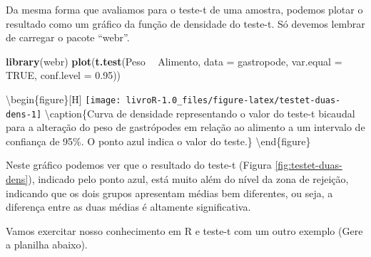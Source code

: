 \documentclass[14pt,titlepage, oneside, openany, a4paper]{book}
\newenvironment{Shaded}{\begin{snugshade}}{\end{snugshade}}
\newcommand{\DataTypeTok}[1]{\textcolor[rgb]{0.13,0.29,0.53}{#1}}
\newcommand{\FloatTok}[1]{\textcolor[rgb]{0.00,0.00,0.81}{#1}}
\newcommand{\KeywordTok}[1]{\textcolor[rgb]{0.13,0.29,0.53}{\textbf{#1}}}
\newcommand{\NormalTok}[1]{#1}
\newcommand{\OperatorTok}[1]{\textcolor[rgb]{0.81,0.36,0.00}{\textbf{#1}}}
\newcommand{\OtherTok}[1]{\textcolor[rgb]{0.56,0.35,0.01}{#1}}
\newcommand{\StringTok}[1]{\textcolor[rgb]{0.31,0.60,0.02}{#1}}
\begin{document}
Da mesma forma que avaliamos para o teste-t de uma amostra, podemos plotar o resultado como um gráfico da função de densidade do teste-t. Só devemos lembrar de carregar o pacote ``webr''.

\begin{Shaded}
\begin{Highlighting}[]
\KeywordTok{library}\NormalTok{(webr)}
\KeywordTok{plot}\NormalTok{(}\KeywordTok{t.test}\NormalTok{(Peso }\OperatorTok{~}\StringTok{ }\NormalTok{Alimento, }
            \DataTypeTok{data =}\NormalTok{ gastropode,}
            \DataTypeTok{var.equal =} \OtherTok{TRUE}\NormalTok{,}
            \DataTypeTok{conf.level =} \FloatTok{0.95}\NormalTok{))}
\end{Highlighting}
\end{Shaded}

\textbackslash{}begin\{figure\}{[}H{]}
\texttt{[image: livroR-1.0\_files/figure-latex/testet-duas-dens-1]} \textbackslash{}caption\{Curva de densidade representando o valor do teste-t bicaudal para a alteração do peso de gastrópodes em relação ao alimento a um intervalo de confiança de 95\%. O ponto azul indica o valor do teste.\}\label{fig:testet-duas-dens}
\textbackslash{}end\{figure\}

Neste gráfico podemos ver que o resultado do teste-t (Figura \ref{fig:testet-duas-dens}), indicado pelo ponto azul, está muito além do nível da zona de rejeição, indicando que os dois grupos apresentam médias bem diferentes, ou seja, a diferença entre as duas médias é altamente significativa.

Vamos exercitar nosso conhecimento em R e teste-t com um outro exemplo (Gere a planilha abaixo).
\end{document}
